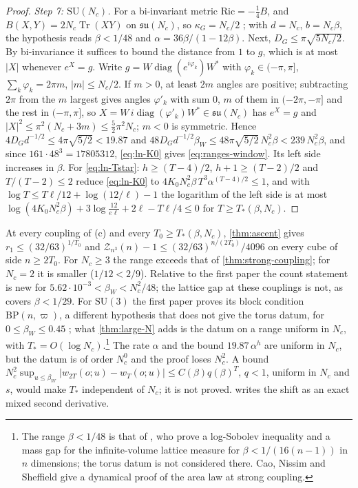 \documentclass[11pt,a4paper]{amsart}
\theoremstyle{definition}
\theoremstyle{remark}
\numberwithin{equation}{section}
\DeclareMathOperator{\Tr}{Tr}        %
\newcommand{\abs}[1]{\lvert #1\rvert}      %
\newcommand{\SU}{\mathrm{SU}}              %
\newcommand{\TT}{\mathbb{T}}               %
\newcommand{\Zc}{\mathcal{Z}}              %
\newcommand{\Zs}[2]{\Zc_{#1}(#2)}          %
\newcommand{\Tzero}{T_0}                   %
\newcommand{\betaW}{\beta_{W}}             %
\begin{document}
\begin{proof}
\emph{Step 7: $\SU(N_c)$.} For a bi-invariant metric $\mathrm{Ric}=-\frac14B$, and $B(X,Y)=2N_c\Tr(XY)$ on $\mathfrak{su}(N_c)$, so $\kappa_G=N_c/2$ \cite[footnote~2]{bhattacharjee2026first}; with $d=N_c$, $b=N_c\beta$, the hypothesis reads $\beta<1/48$ and $\alpha=36\beta/(1-12\beta)$. Next, $D_G\le\pi\sqrt{5N_c/2}$. By bi-invariance it suffices to bound the distance from $1$ to $g$, which is at most $\abs X$ whenever $e^X=g$. Write $g=W\operatorname{diag}(e^{i\varphi_k})W^*$ with $\varphi_k\in(-\pi,\pi]$, $\sum_k\varphi_k=2\pi m$, $\abs m\le N_c/2$. If $m>0$, at least $2m$ angles are positive; subtracting $2\pi$ from the $m$ largest gives angles $\varphi'_k$ with sum $0$, $m$ of them in $(-2\pi,-\pi]$ and the rest in $(-\pi,\pi]$, so $X=W\,i\operatorname{diag}(\varphi'_k)W^*\in\mathfrak{su}(N_c)$ has $e^X=g$ and $\abs X^2\le\pi^2(N_c+3m)\le\frac52\pi^2N_c$; $m<0$ is symmetric. Hence $4D_Gd^{-1/2}\le4\pi\sqrt{5/2}<19.87$ and $48D_Gd^{-1/2}\betaW\le48\pi\sqrt{5/2}\,N_c^2\beta<239\,N_c^2\beta$, and since $161\cdot48^3=17805312$, \eqref{eq:ln-K0} gives \eqref{eq:ranges-window}. Its left side increases in $\beta$. For \eqref{eq:ln-Tstar}: $h\ge(T-4)/2$, $h+1\ge(T-2)/2$ and $T/(T-2)\le2$ reduce \eqref{eq:ln-K0} to $4K_0N_c^2\beta\,T^3\alpha^{(T-4)/2}\le1$, and with $\log T\le T\ell/12+\log(12/\ell)-1$ the logarithm of the left side is at most $\log(4K_0N_c^2\beta)+3\log\frac{12}{e\ell}+2\ell-T\ell/4\le0$ for $T\ge T_*(\beta,N_c)$.
\end{proof}

At every coupling of (c) and every $\Tzero\ge T_*(\beta,N_c)$, \cref{thm:ascent} gives $r_1\le(32/63)^{1/\Tzero}$ and $\Zs{n^3}{n}-1\le(32/63)^{n/(2\Tzero)}/4096$ on every cube of side $n\ge2\Tzero$. For $N_c\ge3$ the range exceeds that of \cref{thm:strong-coupling}; for $N_c=2$ it is smaller ($1/12<2/9$). Relative to the first paper the count statement is new for $5.62\cdot10^{-3}<\betaW<N_c^2/48$; the lattice gap at these couplings is not, as \cite[Thm.~A]{bhattacharjee2026first} covers $\beta<1/29$. For $\SU(3)$ the first paper proves its block condition $\mathrm{BP}(n,\varpi)$, a different hypothesis that does not give the torus datum, for $0\le\betaW\le0.45$ \cite[Thm.~C(i), Thm.~10(ii)]{bhattacharjee2026first}; what \cref{thm:large-N} adds is the datum on a range uniform in $N_c$, with $T_*=O(\log N_c)$.\footnote{The range $\beta<1/48$ is that of \cite{shen2023}, who prove a log-Sobolev inequality and a mass gap for the infinite-volume lattice measure for $\beta<1/(16(n-1))$ in $n$ dimensions; the torus datum is not considered there. Cao, Nissim and Sheffield \cite{cao2025dynamical} give a dynamical proof of the area law at strong coupling.} The rate $\alpha$ and the bound $19.87\,\alpha^h$ are uniform in $N_c$, but the datum is of order $N_c^0$ and the proof loses $N_c^2$. A bound $N_c^2\sup_{u\le\betaW}\abs{w_{2T}(o;u)-w_T(o;u)}\le C(\beta)q(\beta)^T$, $q<1$, uniform in $N_c$ and $s$, would make $T_*$ independent of $N_c$; it is not proved.  writes the shift as an exact mixed second derivative.
\end{document}

